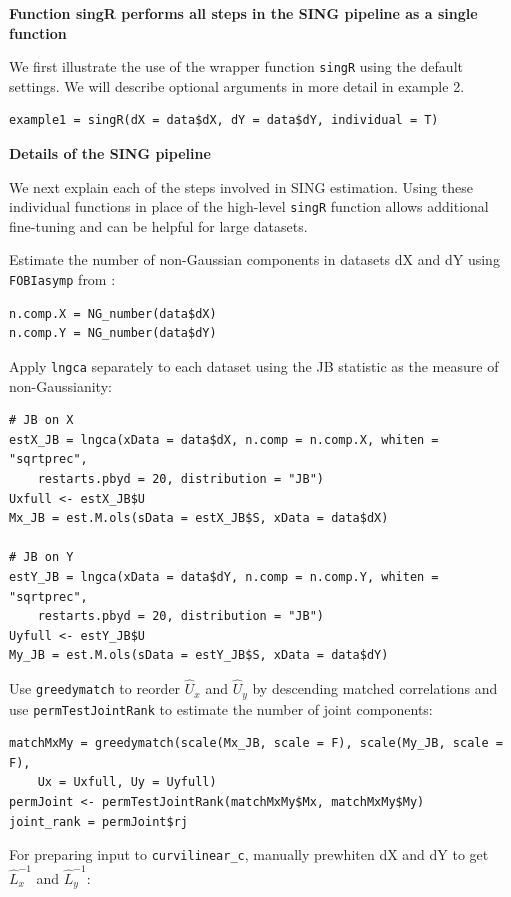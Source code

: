 \textbf{Function singR performs all steps in the SING pipeline as a single function}

We first illustrate the use of the wrapper function \texttt{singR} using the default settings. We will describe optional arguments in more detail in example 2.

\begin{verbatim}
example1 = singR(dX = data$dX, dY = data$dY, individual = T)
\end{verbatim}

\textbf{Details of the SING pipeline}

We next explain each of the steps involved in SING estimation. Using these individual functions in place of the high-level \texttt{singR} function allows additional fine-tuning and can be helpful for large datasets.

Estimate the number of non-Gaussian components in datasets dX and dY using \texttt{FOBIasymp} from :

\begin{verbatim}
n.comp.X = NG_number(data$dX)
n.comp.Y = NG_number(data$dY)
\end{verbatim}

Apply \texttt{lngca} separately to each dataset using the JB statistic as the measure of non-Gaussianity:

\begin{verbatim}
# JB on X
estX_JB = lngca(xData = data$dX, n.comp = n.comp.X, whiten = "sqrtprec",
    restarts.pbyd = 20, distribution = "JB")
Uxfull <- estX_JB$U
Mx_JB = est.M.ols(sData = estX_JB$S, xData = data$dX)

# JB on Y
estY_JB = lngca(xData = data$dY, n.comp = n.comp.Y, whiten = "sqrtprec",
    restarts.pbyd = 20, distribution = "JB")
Uyfull <- estY_JB$U
My_JB = est.M.ols(sData = estY_JB$S, xData = data$dY)
\end{verbatim}

Use \texttt{greedymatch} to reorder \(\widehat{U}_{x}\) and \(\widehat{U}_{y}\) by descending matched correlations and use \texttt{permTestJointRank} to estimate the number of joint components:

\begin{verbatim}
matchMxMy = greedymatch(scale(Mx_JB, scale = F), scale(My_JB, scale = F),
    Ux = Uxfull, Uy = Uyfull)
permJoint <- permTestJointRank(matchMxMy$Mx, matchMxMy$My)
joint_rank = permJoint$rj
\end{verbatim}

For preparing input to \texttt{curvilinear\_c}, manually prewhiten dX and dY to get \(\widehat{L}_{x}^{-1}\) and \(\widehat{L}_{y}^{-1}\):

